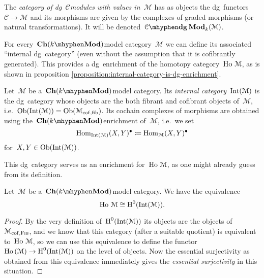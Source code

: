 \begin{refsection}
\begin{definition}
  The \emph{category of dg~$\mathcal{C}$\dash modules with values in~$\mathcal{M}$} has as objects the dg~functors~$\mathcal{C}\to\mathcal{M}$ and its morphisms are given by the complexes of graded morphisms (or natural transformations). It will be denoted~$\dgMod{\mathcal{C}}_k(\mathcal{M})$.
\end{definition}

For every~$\Ch(k\mhyphen\Mod)$\dash model category~$\mathcal{M}$ we can define its associated ``internal dg~category'' (even without the assumption that it is cofibrantly generated). This provides a dg~enrichment of the homotopy category~$\operatorname{\mathrm{Ho} \,}\mathcal{M}$, as is shown in proposition \ref{proposition:internal-category-is-dg-enrichment}.
\begin{definition}
  Let~$\mathcal{M}$ be a~$\Ch(k\mhyphen\Mod)$\dash model category. Its \emph{internal category}~$\operatorname{Int}(\mathcal{M})$ is the dg~category whose objects are the both fibrant and cofibrant objects of~$\mathcal{M}$, i.e.\ $\operatorname{Ob}(\operatorname{Int}(\mathcal{M}))=\operatorname{Ob}(\mathcal{M}_{\mathrm{cof},\mathrm{fib}})$. Its cochain complexes of morphisms are obtained using the~$\Ch(k\mhyphen\Mod)$\dash enrichment of~$\mathcal{M}$, i.e.\ we set
  \begin{equation}
    \mathrm{Hom}_{\operatorname{Int}(\mathcal{M})}(X,Y)^\bullet\coloneqq\mathrm{Hom}_{\mathcal{M}}(X,Y)^\bullet
  \end{equation}
  for~$X,Y\in\operatorname{Ob}(\operatorname{Int}(\mathcal{M}))$.
\end{definition}
This dg~category serves as an enrichment for~$\operatorname{\mathrm{Ho} \,}\mathcal{M}$, as one might already guess from its definition.
\begin{proposition}
  \label{proposition:internal-category-is-dg-enrichment}
  Let~$\mathcal{M}$ be a~$\Ch(k\mhyphen\Mod)$\dash model category. We have the equivalence
  \begin{equation}
    \operatorname{\mathrm{Ho} \,}\mathcal{M}\cong\operatorname{H}^0(\operatorname{Int}(\mathcal{M})).
  \end{equation}

  \begin{proof}
    By the very definition of~$\operatorname{H}^0(\operatorname{Int}(\mathcal{M}))$ its objects are the objects of~$\mathcal{M}_{\mathrm{cof},\textsc{Fib}}$, and we know that this category (after a suitable quotient) is equivalent to~$\operatorname{\mathrm{Ho} \,}\mathcal{M}$, so we can use this equivalence to define the functor~$\operatorname{\mathrm{Ho} \,}(\mathcal{M})\to\operatorname{H}^0(\operatorname{Int}(\mathcal{M}))$ on the level of objects. Now the essential surjectivity as obtained from this equivalence immediately gives the \emph{essential surjectivity} in this situation.


\end{proof}
\end{proposition}
\end{refsection}
